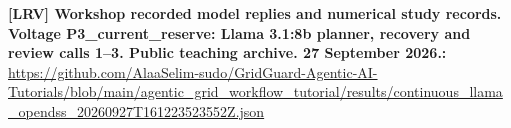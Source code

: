 \documentclass[10pt,letterpaper]{article}
\begin{document}
\textbf{[LRV] Workshop recorded model replies and numerical study records. Voltage P3\_current\_reserve: Llama 3.1:8b planner, recovery and review calls 1--3. Public teaching archive. 27 September 2026.:} \href{https://github.com/AlaaSelim-sudo/GridGuard-Agentic-AI-Tutorials/blob/main/agentic_grid_workflow_tutorial/results/continuous_llama_opendss_20260927T161223523552Z.json}{\small\ttfamily https:/\allowbreak{}/\allowbreak{}github.\allowbreak{}com/\allowbreak{}AlaaSelim-\allowbreak{}sudo/\allowbreak{}GridGuard-\allowbreak{}Agentic-\allowbreak{}AI-\allowbreak{}Tutorials/\allowbreak{}blob/\allowbreak{}main/\allowbreak{}agentic\_\allowbreak{}grid\_\allowbreak{}workflow\_\allowbreak{}tutorial/\allowbreak{}results/\allowbreak{}continuous\_\allowbreak{}llama\_\allowbreak{}opendss\_\allowbreak{}20260927T161223523552Z.\allowbreak{}json}\par
\par\medskip
\end{document}
